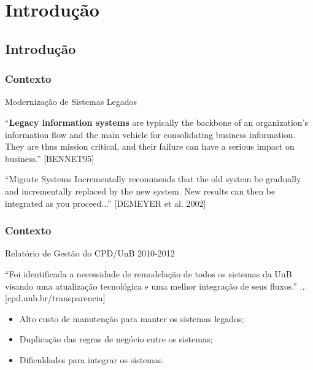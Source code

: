 \documentclass{beamer}
\begin{document}




\section{Introdução}


\subsection{Introdução}


\begin{frame}
  \frametitle{Contexto}

  \begin{exampleblock}{Modernização de Sistemas Legados}
  
  “\textbf{Legacy information systems} are typically the
	backbone of an organization’s information flow
	and the main vehicle for consolidating business
	information. They are thus mission critical, and
	their failure can have a serious impact on
	business.” [BENNET95]

	\vspace{0.5cm} 

	“Migrate Systems Incrementally recommends that the old system be
	gradually and incrementally replaced by the new system. New
	results can then be integrated as you proceed...” [DEMEYER et al. 2002]
  \end{exampleblock}

  
\end{frame}









\begin{frame}
  \frametitle{Contexto}

  \begin{exampleblock}{Relatório de Gestão do CPD/UnB 2010-2012}
  
		“Foi identificada a necessidade de remodelação de todos os sistemas
da UnB visando uma atualização tecnológica e uma melhor
integração de seus fluxos.” ... [cpd.unb.br/transparencia]

    \begin{itemize}
  	  \item<1-> Alto custo de manutenção para manter os sistemas legados;
   	  \item<1-> Duplicação das regras de negócio entre os sistemas;
  	  \item<1-> Dificuldades para integrar os sistemas.
    \end{itemize}


  \end{exampleblock}

  
\end{frame}
\end{document}
